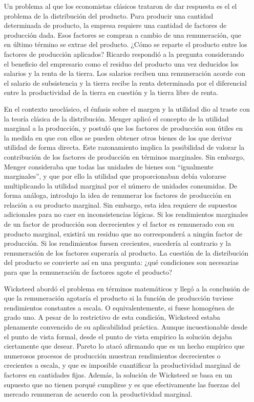 \documentclass{nuevotema}
\begin{document}
\conceptos


Un problema al que los economistas clásicos trataron de dar respuesta es el el problema de la distribución del producto. Para producir una cantidad determinada de producto, la empresa requiere una cantidad de factores de producción dada. Esos factores se compran a cambio de una remuneración, que en último término se extrae del producto. ¿Cómo se reparte el producto entre los factores de producción aplicados? Ricardo respondió a la pregunta considerando el beneficio del empresario como el residuo del producto una vez deducidos los salarios y la renta de la tierra. Los salarios reciben una remuneración acorde con el salario de subsistencia y la tierra recibe la renta determinada por el diferencial entre la productividad de la tierra en cuestión y la tierra libre de renta.

En el contexto neoclásico, el énfasis sobre el margen y la utilidad dio al traste con la teoría clásica de la distribución. Menger aplicó el concepto de la utilidad marginal a la producción, y postuló que los factores de producción son útiles en la medida en que con ellos se pueden obtener otros bienes de los que derivar utilidad de forma directa. Este razonamiento implica la posibilidad de valorar la contribución de los factores de producción en términos marginales. Sin embargo, Menger consideraba que todas las unidades de bienes son ``igualmente marginales'', y que por ello la utilidad que proporcionaban debía valorarse multiplicando la utilidad marginal por el número de unidades consumidas. De forma análoga, introdujo la idea de remunerar los factores de producción en relación a su producto marginal. Sin embargo, esta idea requiere de supuestos adicionales para no caer en inconsistencias lógicas. Si los rendimientos marginales de un factor de producción son decrecientes y el factor es remunerado con su producto marginal, existirá un residuo que no corresponderá a ningún factor de producción. Si los rendimientos fuesen crecientes, sucedería al contrario y la remuneración de los factores superaría al producto. La cuestión de la distribución del producto se convierte así en una pregunta: ¿qué condiciones son necesarias para que la remuneración de factores agote el producto?

Wicksteed abordó el problema en términos matemáticos y llegó a la conclusión de que la remuneración agotaría el producto si la función de producción tuviese rendimientos constantes a escala. O equivalentemente, si fuese homogénea de grado uno. A pesar de lo restrictivo de esta condición, Wicksteed estaba plenamente convencido de su aplicabilidad práctica. Aunque incuestionable desde el punto de vista formal, desde el punto de vista empírico la solución dejaba ciertamente que desear. Pareto lo atacó afirmando que es un hecho empírico que numerosos procesos de producción muestran rendimientos decrecientes o crecientes a escala, y que es imposible cuantificar la productividad marginal de factores en cantidades fijas. Además, la solución de Wicksteed se basa en un supuesto que no tienen porqué cumplirse y es que efectivamente las fuerzas del mercado remuneran de acuerdo con la productividad marginal.
\end{document}
